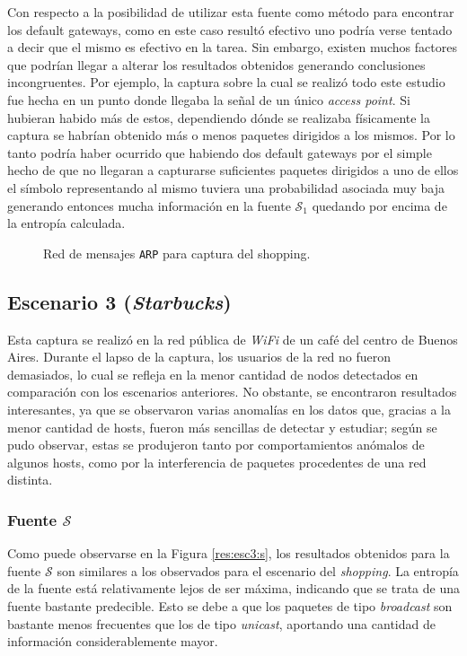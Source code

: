 Con respecto a la posibilidad de utilizar esta fuente como método para encontrar
los default gateways, como en este caso resultó efectivo uno podría verse
tentado a decir que el mismo es efectivo en la tarea. Sin embargo, existen muchos
factores que podrían llegar a alterar los resultados obtenidos generando
conclusiones incongruentes. Por ejemplo, la captura sobre la cual se realizó
todo este estudio fue hecha en un punto donde llegaba la señal de un único
\emph{access point}. Si hubieran habido más de estos, dependiendo dónde se
realizaba físicamente la captura se habrían obtenido más o menos paquetes
dirigidos a los mismos. Por lo tanto podría haber ocurrido que habiendo dos
default gateways por el simple hecho de que no llegaran a capturarse suficientes
paquetes dirigidos a uno de ellos el símbolo representando al mismo tuviera una
probabilidad asociada muy baja generando entonces mucha información en la fuente
$\mathcal{S}_1$ quedando por encima de la entropía calculada.

\begin{figure}[h!]
    \caption{Red de mensajes \texttt{ARP} para captura del shopping.}
    \label{res:esc2:fig3}
\end{figure}

\vfill %

\subsection{Escenario 3 (\emph{Starbucks})}

Esta captura se realizó en la red pública de \emph{WiFi} de un café del centro
de Buenos Aires. Durante el lapso de la captura, los usuarios de la red no
fueron demasiados, lo cual se refleja en la menor cantidad de nodos detectados
en comparación con los escenarios anteriores. No obstante, se encontraron
resultados interesantes, ya que se observaron varias anomalías en los datos
que, gracias a la menor cantidad de hosts, fueron más sencillas de detectar y
estudiar; según se pudo observar, estas se produjeron tanto por
comportamientos anómalos de algunos hosts, como por la interferencia de
paquetes procedentes de una red distinta.

\subsubsection{Fuente $\mathcal{S}$}

Como puede observarse en la Figura \ref{res:esc3:s}, los resultados
obtenidos para la fuente $\mathcal{S}$ son similares a los observados para el
escenario del \emph{shopping}. La entropía de la fuente está relativamente
lejos de ser máxima, indicando que se trata de una fuente bastante predecible.
Esto se debe a que los paquetes de tipo \emph{broadcast} son bastante menos
frecuentes que los de tipo \emph{unicast}, aportando una cantidad de
información considerablemente mayor.

